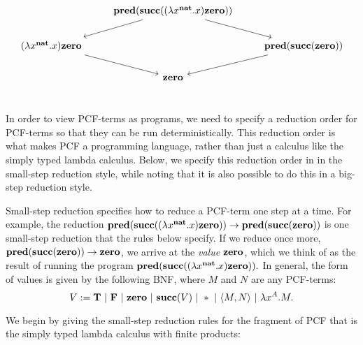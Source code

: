 \[
\begin{tikzcd}[ampersand replacement=\&]
\& \mathbf{pred} (\mathbf{succ} ((\lambda x^{\textbf{nat}}.x)\mathbf{zero})) \ar[ld] \ar[rd]\& \\
(\lambda x^{\textbf{nat}}.x)\textbf{zero} \ar[rd] \& \& \textbf{pred} ( \textbf{succ} (\mathbf{zero})) \ar[ld] \\
\& \textbf{zero} \& \\
\end{tikzcd}
\]

In order to view PCF-terms as programs, we need to specify a reduction order for PCF-terms so that they can be run deterministically. This reduction order is what makes PCF a programming language, rather than just a calculus like the simply typed lambda calculus. Below, we specify this reduction order in in the small-step reduction style, while noting that it is also possible to do this in a big-step reduction style.


Small-step reduction specifies how to reduce a PCF-term one step at a time. For example, the reduction $\textbf{pred}(\textbf{succ}((\lambda x^{\textbf{nat}}.x)\textbf{zero})) \to \textbf{pred}(\textbf{succ}(\textbf{zero}))$ is one small-step reduction that the rules below specify. If we reduce once more, $\textbf{pred}(\textbf{succ}(\textbf{zero})) \to \textbf{zero}$, we arrive at the \textit{value} $\textbf{zero}$, which we think of as the result of running the program $\textbf{pred}(\textbf{succ}((\lambda x^{\textbf{nat}}.x)\textbf{zero})).$ In general, the form of values is given by the following BNF, where $M$ and $N$ are any PCF-terms:
$$ V := \textbf{T} \ \mathbf{|}\  \textbf{F} \ \mathbf{|}\  \textbf{zero} \ \mathbf{|}\  \textbf{succ}(V) \ \mathbf{|}\  * \ \mathbf{|}\  \langle M,N \rangle \ \mathbf{|}\  \lambda x^A.M.$$

We begin by giving the small-step reduction rules for the fragment of PCF that is the simply typed lambda calculus with finite products:

